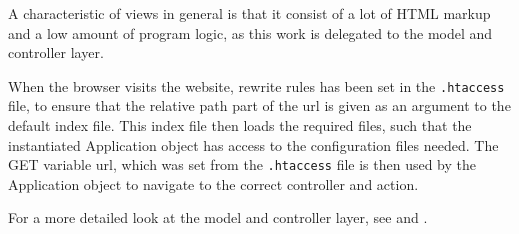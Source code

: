 \begin{description}[style=nextline]
	A characteristic of views in general is that it consist of a lot of HTML markup and a low amount of program logic, as this work is delegated to the model and controller layer. 
	
	\item[Application]
	When the browser visits the website, rewrite rules has been set in the \texttt{.htaccess} file, to ensure that the relative path part of the url is given as an argument to the default index file. This index file then loads the required files, such that the instantiated Application object has access to the configuration files needed.
	The GET variable url, which was set from the \texttt{.htaccess} file is then used by the Application object to navigate to the correct controller and action.
	
	
\end{description}

For a more detailed look at the model and controller layer, see  and .